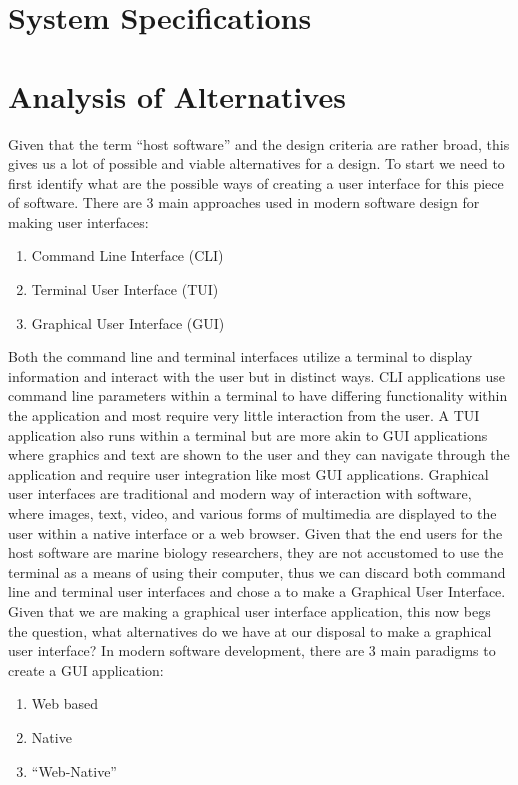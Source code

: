 \documentclass[12pt]{article}
\begin{document}
\section{System Specifications}
\section{Analysis of Alternatives}
Given that the term ``host software'' and the design criteria are rather broad, this gives us a lot of possible and viable alternatives for a design. To start we need to first identify what are the possible ways of creating a user interface for this piece of software. There are 3 main approaches used in modern software design for making user interfaces:
\begin{enumerate}
	\item Command Line Interface (CLI)
	\item Terminal User Interface (TUI)
	\item Graphical User Interface (GUI)
\end{enumerate}
Both the command line and terminal interfaces utilize a terminal to display information and interact with the user but in distinct ways. CLI applications use command line parameters within a terminal to have differing functionality within the application and most require very little interaction from the user. A TUI application also runs within a terminal but are more akin to GUI applications where graphics and text are shown to the user and they can navigate through the application and require user integration like most GUI applications. Graphical user interfaces are traditional and modern way of interaction with software, where images, text, video, and various forms of multimedia are displayed to the user within a native interface or a web browser. Given that the end users for the host software are marine biology researchers, they are not accustomed to use the terminal as a means of using their computer, thus we can discard both command line and terminal user interfaces and chose a to make a Graphical User Interface.\\
Given that we are making a graphical user interface application, this now begs the question, what alternatives do we have at our disposal to make a graphical user interface? In modern software development, there are 3 main paradigms to create a GUI application:
\begin{enumerate}
	\item Web based
	\item Native
	\item ``Web-Native''
\end{enumerate}
\end{document}
